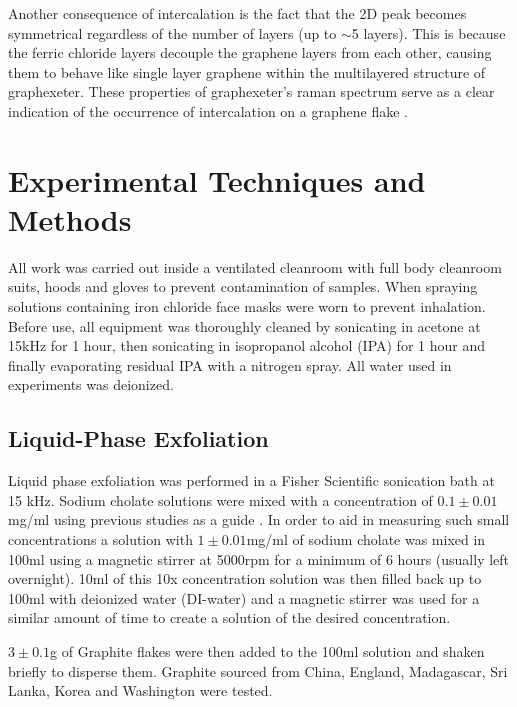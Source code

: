 \documentclass[12pt,titlepage]{article}
\begin{document}
	Another consequence of intercalation is the fact that the 2D peak becomes symmetrical regardless of the number of layers (up to $\sim$5 layers). This is because the ferric chloride layers decouple the graphene layers from each other, causing them to behave like single layer graphene within the multilayered structure of graphexeter. These properties of graphexeter's raman spectrum serve as a clear indication of the occurrence of intercalation on a graphene flake \cite{Khrapach2012a}.
	
	\newpage
	\section{Experimental Techniques and Methods}
		All work was carried out inside a ventilated cleanroom with full body cleanroom suits, hoods and gloves to prevent contamination of samples. When spraying solutions containing iron chloride face masks were worn to prevent inhalation. Before use, all equipment was thoroughly cleaned by sonicating in acetone at 15kHz for 1 hour, then sonicating in isopropanol alcohol (IPA) for 1 hour and finally evaporating residual IPA with a nitrogen spray. All water used in experiments was deionized. 
		
	\subsection{Liquid-Phase Exfoliation}
	
	Liquid phase exfoliation was performed in a Fisher Scientific sonication bath at 15 kHz. Sodium cholate solutions were mixed with a concentration of $0.1\pm 0.01$mg/ml using previous studies as a guide \cite{De2010}. In order to aid in measuring such small concentrations a solution with $1\pm 0.01$mg/ml of sodium cholate was mixed in 100ml using a magnetic stirrer at 5000rpm for a minimum of 6 hours (usually left overnight). 10ml of this 10x concentration solution was then filled back up to 100ml with deionized water (DI-water) and a magnetic stirrer was used for a similar amount of time to create a solution of the desired concentration.
	
	$3\pm 0.1$g of Graphite flakes were then added to the 100ml solution and shaken briefly to disperse them. Graphite sourced from China, England, Madagascar, Sri Lanka, Korea and Washington were tested.
	
\end{document}
